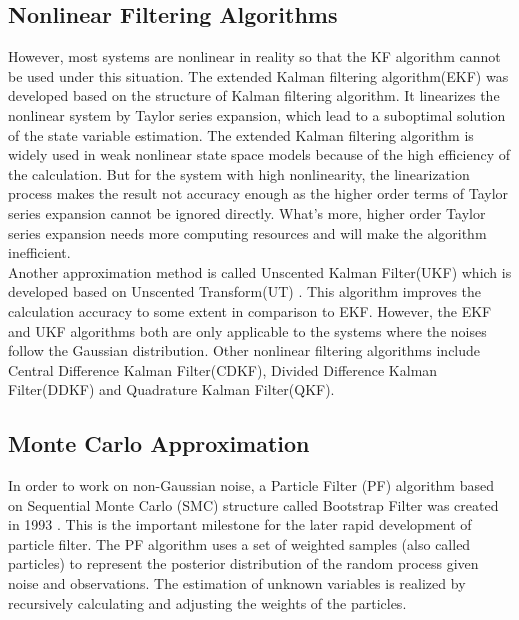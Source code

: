 \documentclass[mstat,12pt]{unswthesis}  %
\numberwithin{equation}{section}
\begin{document}
\subsection{Nonlinear Filtering Algorithms}
\noindent However, most systems are nonlinear
in reality so that the KF  algorithm cannot be used under this situation. 
The extended Kalman filtering algorithm(EKF)\cite{bucy1971digital,sunahara1970approximate} was developed based on 
the structure of Kalman filtering algorithm.
It linearizes the nonlinear system by Taylor series expansion,
which lead to a suboptimal solution of the state variable estimation.
The extended Kalman filtering algorithm is widely used in
weak nonlinear state space models because of the high efficiency of the calculation.
But for the system with high nonlinearity, the linearization process makes the result not accuracy enough as the higher order terms of Taylor series expansion cannot be ignored directly.
What's more, higher order
Taylor series expansion needs more computing resources and will
make the algorithm inefficient.\\

\noindent Another approximation method is called Unscented Kalman Filter(UKF) which is developed based on Unscented Transform(UT) \cite{julier1997new}. This algorithm improves the calculation accuracy to some extent 
in comparison to EKF. 
However, the EKF and UKF algorithms  both are only applicable to the systems where the noises  follow the Gaussian distribution.
Other nonlinear filtering algorithms include Central Difference Kalman Filter(CDKF), Divided Difference Kalman Filter(DDKF) and
Quadrature Kalman Filter(QKF).\\

\subsection{Monte Carlo Approximation}
\noindent In order to work on non-Gaussian noise, a Particle Filter (PF) algorithm based on Sequential Monte Carlo (SMC) structure called Bootstrap Filter was created in 1993 \cite{gordon1993novel}. This is the important milestone for the later rapid development of particle filter.
The PF algorithm uses a set of weighted samples (also called particles)  to represent the posterior distribution of the random process given noise and observations. 
The  estimation of unknown variables is realized by recursively calculating and adjusting the weights of the particles. \\
\end{document}
